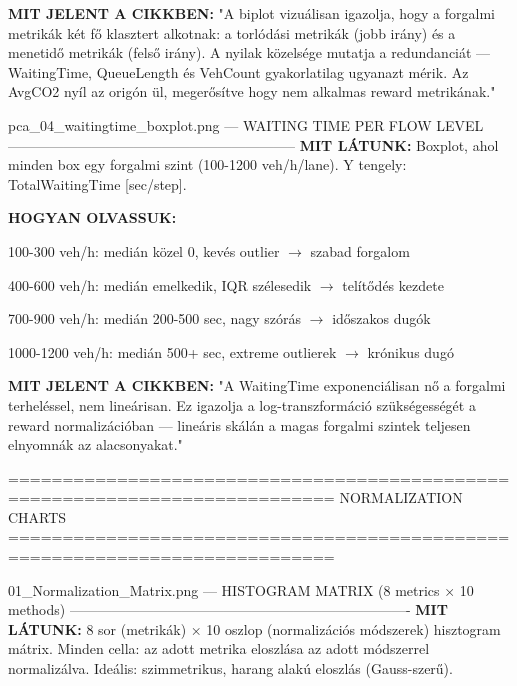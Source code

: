 \documentclass[11pt,a4paper]{article}
\begin{document}
\textbf{MIT JELENT A CIKKBEN:}
"A biplot vizuálisan igazolja, hogy a forgalmi metrikák két
fő klasztert alkotnak: a torlódási metrikák (jobb irány) és
a menetidő metrikák (felső irány). A nyilak közelsége mutatja
a redundanciát — WaitingTime, QueueLength és VehCount gyakorlatilag
ugyanazt mérik. Az AvgCO2 nyíl az origón ül, megerősítve hogy
nem alkalmas reward metrikának."

pca\_04\_waitingtime\_boxplot.png — WAITING TIME PER FLOW LEVEL
--------------------------------------------------------------
\textbf{MIT LÁTUNK:}
Boxplot, ahol minden box egy forgalmi szint (100-1200 veh/h/lane).
Y tengely: TotalWaitingTime [sec/step].

\textbf{HOGYAN OLVASSUK:}
\par\noindent\hspace*{1em}\textbullet{} 100-300 veh/h: medián közel 0, kevés outlier $\rightarrow$ szabad forgalom
\par\noindent\hspace*{1em}\textbullet{} 400-600 veh/h: medián emelkedik, IQR szélesedik $\rightarrow$ telítődés kezdete
\par\noindent\hspace*{1em}\textbullet{} 700-900 veh/h: medián 200-500 sec, nagy szórás $\rightarrow$ időszakos dugók
\par\noindent\hspace*{1em}\textbullet{} 1000-1200 veh/h: medián 500+ sec, extreme outlierek $\rightarrow$ krónikus dugó

\textbf{MIT JELENT A CIKKBEN:}
"A WaitingTime exponenciálisan nő a forgalmi terheléssel,
nem lineárisan. Ez igazolja a log-transzformáció szükségességét
a reward normalizációban — lineáris skálán a magas forgalmi
szintek teljesen elnyomnák az alacsonyakat."

============================================================================
NORMALIZATION CHARTS
============================================================================

01\_Normalization\_Matrix.png — HISTOGRAM MATRIX (8 metrics × 10 methods)
-------------------------------------------------------------------------
\textbf{MIT LÁTUNK:}
8 sor (metrikák) × 10 oszlop (normalizációs módszerek) hisztogram mátrix.
Minden cella: az adott metrika eloszlása az adott módszerrel normalizálva.
Ideális: szimmetrikus, harang alakú eloszlás (Gauss-szerű).
\end{document}
